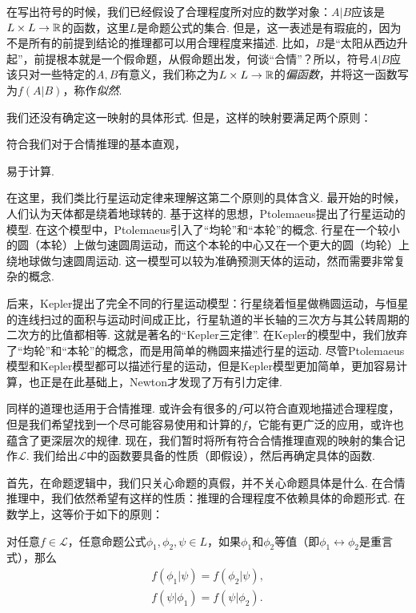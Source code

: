 在写出符号的时候，我们已经假设了合理程度所对应的数学对象：$A|B$应该是$L\times L\to\mathbb{R}$的函数，这里$L$是命题公式的集合. 但是，这一表述是有瑕疵的，因为不是所有的前提到结论的推理都可以用合理程度来描述. 比如，$B$是“太阳从西边升起”，前提根本就是一个假命题，从假命题出发，何谈“合情”？所以，符号$A|B$应该只对一些特定的$A,B$有意义，我们称之为$L\times L\to\mathbb{R}$的\textit{偏函数}，并将这一函数写为$f(A|B)$，称作\textit{似然}.

我们还没有确定这一映射的具体形式. 但是，这样的映射要满足两个原则：
\begin{enumerate*}
    \item 符合我们对于合情推理的基本直观，
    \item 易于计算.
\end{enumerate*}

在这里，我们类比行星运动定律来理解这第二个原则的具体含义. 最开始的时候，人们认为天体都是绕着地球转的. 基于这样的思想，Ptolemaeus提出了行星运动的模型. 在这个模型中，Ptolemaeus引入了“均轮”和“本轮”的概念. 行星在一个较小的圆（本轮）上做匀速圆周运动，而这个本轮的中心又在一个更大的圆（均轮）上绕地球做匀速圆周运动. 这一模型可以较为准确预测天体的运动，然而需要非常复杂的概念. 

后来，Kepler提出了完全不同的行星运动模型：行星绕着恒星做椭圆运动，与恒星的连线扫过的面积与运动时间成正比，行星轨道的半长轴的三次方与其公转周期的二次方的比值都相等. 这就是著名的“Kepler三定律”. 在Kepler的模型中，我们放弃了“均轮”和“本轮”的概念，而是用简单的椭圆来描述行星的运动. 尽管Ptolemaeus模型和Kepler模型都可以描述行星的运动，但是Kepler模型更加简单，更加容易计算，也正是在此基础上，Newton才发现了万有引力定律. 

同样的道理也适用于合情推理. 或许会有很多的$f$可以符合直观地描述合理程度，但是我们希望找到一个尽可能容易使用和计算的$f$，它能有更广泛的应用，或许也蕴含了更深层次的规律. 现在，我们暂时将所有符合合情推理直观的映射的集合记作$\mathcal L$. 我们给出$\mathcal L$中的函数要具备的性质（即假设），然后再确定具体的函数. 

首先，在命题逻辑中，我们只关心命题的真假，并不关心命题具体是什么. 在合情推理中，我们依然希望有这样的性质：推理的合理程度不依赖具体的命题形式. 在数学上，这等价于如下的原则：

\begin{principle}[等值原则]
    对任意$f\in\mathcal L$，任意命题公式$\phi_1,\phi_2,\psi\in L$，如果$\phi_1$和$\phi_2$等值（即$\phi_1\leftrightarrow\phi_2$是重言式），那么
    \begin{gather*}
        f(\phi_1|\psi) = f(\phi_2|\psi),\\
        f(\psi|\phi_1) = f(\psi|\phi_2).
        \end{gather*}
\end{principle}

